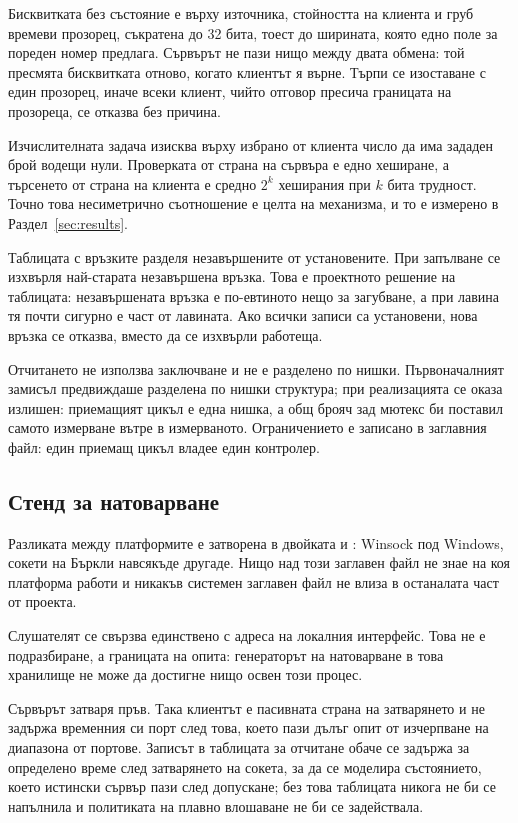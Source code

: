 Бисквитката без състояние е  върху източника, стойността на клиента и груб
времеви прозорец, съкратена до 32 бита, тоест до ширината, която едно поле за пореден номер
предлага. Сървърът не пази нищо между двата обмена: той пресмята бисквитката отново, когато
клиентът я върне. Търпи се изоставане с един прозорец, иначе всеки клиент, чийто отговор
пресича границата на прозореца, се отказва без причина.

Изчислителната задача изисква  върху избрано от клиента число да има
зададен брой водещи нули. Проверката от страна на сървъра е едно хеширане, а търсенето от
страна на клиента е средно $2^{k}$ хеширания при $k$ бита трудност. Точно това несиметрично
съотношение е целта на механизма, и то е измерено в Раздел~\ref{sec:results}.

Таблицата с връзките разделя незавършените от установените. При запълване се изхвърля
най-старата незавършена връзка. Това е проектното решение на таблицата: незавършената
връзка е по-евтиното нещо за загубване, а при лавина тя почти сигурно е част от лавината.
Ако всички записи са установени, нова връзка се отказва, вместо да се изхвърли работеща.

Отчитането не използва заключване и не е разделено по нишки. Първоначалният замисъл
предвиждаше разделена по нишки структура; при реализацията се оказа излишен: приемащият цикъл
е една нишка, а общ брояч зад мютекс би поставил самото измерване вътре в измерваното.
Ограничението е записано в заглавния файл: един приемащ цикъл владее един контролер.

\subsection{Стенд за натоварване}
\label{subsec:impl_harness}

Разликата между платформите е затворена в двойката  и : Winsock
под Windows, сокети на Бъркли навсякъде другаде. Нищо над този заглавен файл не знае на коя
платформа работи и никакъв системен заглавен файл не влиза в останалата част от проекта.

Слушателят се свързва единствено с адреса на локалния интерфейс. Това не е подразбиране, а
границата на опита: генераторът на натоварване в това хранилище не може да достигне нищо
освен този процес.

Сървърът затваря пръв. Така клиентът е пасивната страна на затварянето и не задържа
временния си порт след това, което пази дълъг опит от изчерпване на диапазона от портове.
Записът в таблицата за отчитане обаче се задържа за определено време след затварянето на
сокета, за да се моделира състоянието, което истински сървър пази след допускане; без това
таблицата никога не би се напълнила и политиката на плавно влошаване не би се задействала.

